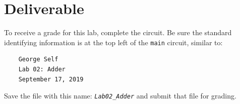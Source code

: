\section{Deliverable}

To receive a grade for this lab, complete the circuit. Be sure the standard identifying information is at the top left of the \lstinline{main} circuit, similar to: 

\bigskip
\begin{minipage}{\linewidth}
	\begin{verbatim}
	George Self
	Lab 02: Adder
	September 17, 2019
	\end{verbatim}
\end{minipage}
\bigskip

Save the file with this name: \emph{\texttt{Lab02\_Adder}} and submit that file for grading.

